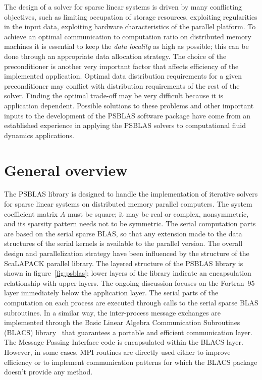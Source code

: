 The design of a solver for sparse linear systems is driven by many
conflicting objectives, such as limiting occupation of storage
resources, exploiting regularities in the input data, exploiting
hardware characteristics of the parallel platform.  To achieve an
optimal communication to computation ratio on distributed memory
machines it is essential to keep the {\em data locality} as high as
possible; this can be done through an appropriate data allocation
strategy.  The choice of the preconditioner is another very important
factor that affects efficiency of the implemented application. Optimal
data distribution requirements for a given preconditioner may conflict
with distribution requirements of the rest of the solver. Finding the
optimal trade-off may be very difficult because it is application
dependent.  Possible solutions to these problems and other important
inputs to the development of the PSBLAS software package have come from
an established experience in applying the PSBLAS solvers to
computational fluid dynamics applications.

\section{General overview}
\label{sec:overview} 
The PSBLAS library is designed to handle the implementation of
iterative solvers for sparse linear systems on distributed memory
parallel computers.  The system coefficient matrix $A$ must be square;
it may be real or complex, nonsymmetric, and its sparsity pattern
needs not to be symmetric.  The serial computation parts are based on
the serial sparse BLAS, so that any extension made to the data
structures of the serial kernels is available to the parallel
version. The overall design and parallelization strategy have been
influenced by the structure of the ScaLAPACK parallel
library.  The layered structure of the PSBLAS library
is shown in figure~\ref{fig:psblas}; lower layers of the library
indicate an encapsulation relationship with upper layers. The ongoing
discussion focuses on the Fortran~95 layer immediately below the
application layer.
The serial parts of the computation on each process are executed through
calls to the serial sparse BLAS subroutines. In a similar way, the
inter-process message exchanges are implemented through the Basic
Linear Algebra Communication Subroutines (BLACS) library~\cite{BLACS}
that guarantees a portable and efficient communication layer. The
Message Passing Interface code is encapsulated within the BLACS
layer. However, in some cases, MPI routines are directly used either
to improve efficiency or to implement communication patterns for which
the BLACS package doesn't provide any method. 

